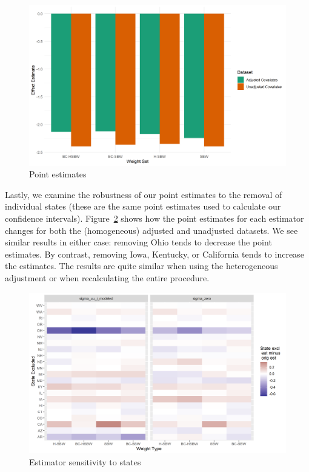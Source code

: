 \begin{figure}[H]
\begin{center}
    \caption{Point estimates}
    \label{fig:estimators}
    \includegraphics[scale=0.6]{01_Plots/point-estimates-c1.png}
\end{center}
\end{figure}

Lastly, we examine the robustness of our point estimates to the removal of individual states (these are the same point estimates used to calculate our confidence intervals). Figure~\ref{fig:loostateplot} shows how the point estimates for each estimator changes for both the (homogeneous) adjusted and unadjusted datasets. We see similar results in either case: removing Ohio tends to decrease the point estimates. By contrast, removing Iowa, Kentucky, or California tends to increase the estimates. The results are quite similar when using the heterogeneous adjustment or when recalculating the entire procedure.

\begin{figure}[H]
\begin{center}
    \caption{Estimator sensitivity to states}
    \label{fig:loostateplot}
    \includegraphics[scale=0.6]{01_Plots/loostate-sensitivityc1-state-uu-i.png}
\end{center}
\end{figure}

